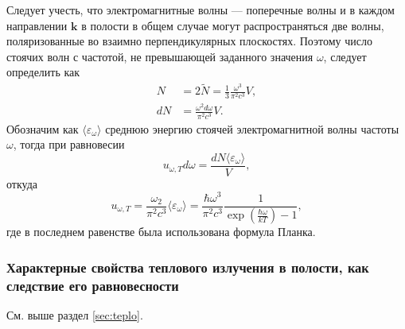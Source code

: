 Следует учесть, что электромагнитные волны --- поперечные
волны и в каждом направлении $ \mathbf k $ в полости в общем случае могут
распространяться две волны, поляризованные во взаимно 
перпендикулярных плоскостях. Поэтому число стоячих волн с частотой,
не превышающей заданного значения $ \omega $, следует определить как 
\begin{align}
  N &= 2\tilde N = \frac{1}{3} \frac{\omega^3}{\pi^2 c^3}V,\\
  dN &= \frac{\omega^2 d\omega}{\pi^2 c^3}V.
  \label{eq:mods}
\end{align}
Обозначим как $ \langle \varepsilon_\omega \rangle $ среднюю энергию стоячей
электромагнитной волны частоты $ \omega $, тогда при равновесии
\[
  u_{\omega, T}d\omega = \frac{dN\langle \varepsilon_\omega \rangle}{V},  
\]
откуда  
\[
  u_{\omega, T} = \frac{\omega_2}{\pi^2 c^3} \langle \varepsilon_\omega \rangle
= \frac{\hbar \omega^3}{\pi^2 c^3} \frac{1}{\exp(\frac{\hbar\omega}{kT}) - 1},
\]
где в последнем равенстве была использована формула Планка.


\subsubsection{Характерные свойства теплового излучения в полости, как следствие его равновесности}
См. выше раздел \ref{sec:teplo}.




